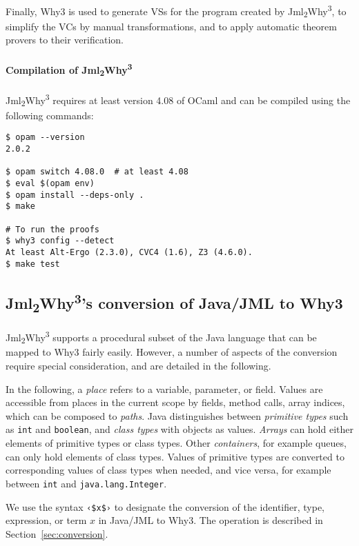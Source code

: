 \documentclass[a4paper]{report}
\newcommand{\cref}[1]{Section~\ref{#1}}
\newcommand{\jmlwhy}{\texorpdfstring{Jml\textsubscript{2}Why\textsuperscript{3}}{Jml2Why3}}
\begin{document}
Finally, Why3 is used to generate VSs for the program created by \jmlwhy, to
simplify the VCs by manual transformations, and to apply automatic theorem
provers to their verification.

\paragraph{Compilation of \jmlwhy}

\jmlwhy{} requires at least version 4.08 of OCaml and can be compiled using the
following commands:
\begin{lstlisting}[mathescape=false]
$ opam --version
2.0.2

$ opam switch 4.08.0  # at least 4.08
$ eval $(opam env)
$ opam install --deps-only .
$ make

# To run the proofs
$ why3 config --detect
At least Alt-Ergo (2.3.0), CVC4 (1.6), Z3 (4.6.0).
$ make test
\end{lstlisting}

\subsection{\jmlwhy's conversion of Java/JML to Why3}
\label{sec:jmlwhy-conversion}

\jmlwhy{} supports a procedural subset of the Java language that can be mapped
to Why3 fairly easily. However, a number of aspects of the conversion require
special consideration, and are detailed in the following.

In the following, a \emph{place} refers to a variable, parameter, or field.
Values are accessible from places in the current scope by fields, method calls,
array indices, which can be composed to \emph{paths}. Java distinguishes between
\emph{primitive types} such as \texttt{int} and \texttt{boolean}, and
\emph{class types} with objects as values.
\emph{Arrays} can hold either elements of primitive types or class types. Other
\emph{containers}, for example queues, can only hold elements of class types.
Values of primitive types are converted to corresponding values of class types
when needed, and vice versa, for example between \texttt{int} and
\texttt{java.lang.Integer}.

We use the syntax \lstinline{‹$x$›} to designate the conversion of the
identifier, type, expression, or term $x$ in Java/JML to Why3. The operation is
described in \cref{sec:conversion}.
\end{document}
